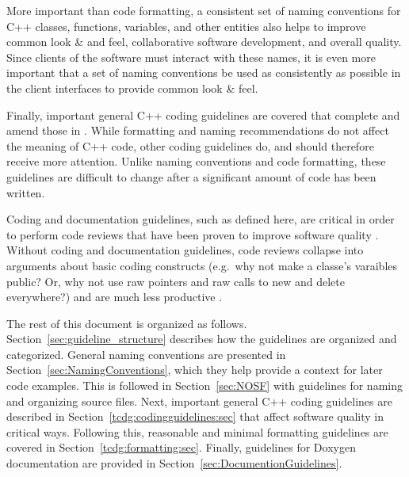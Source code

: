 More important than code formatting, a consistent set of naming
conventions for C++ classes, functions, variables, and other entities
also helps to improve common look \& and feel, collaborative software
development, and overall quality.  Since clients of the software must
interact with these names, it is even more important that a set of
naming conventions be used as consistently as possible in the client
interfaces to provide common look \& feel.

Finally, important general C++ coding guidelines are covered that
complete and amend those in {}\cite{C++CodingStandards05}.  While
formatting and naming recommendations do not affect the meaning of C++
code, other coding guidelines do, and should therefore receive more
attention.  Unlike naming conventions and code formatting, these
guidelines are difficult to change after a significant amount of code
has been written.

Coding and documentation guidelines, such as defined here, are
critical in order to perform code reviews that have been proven to
improve software quality {}\cite{CodeComplete2nd04}.  Without coding
and documentation guidelines, code reviews collapse into arguments
about basic coding constructs (e.g.\ why not make a classe's varaibles
public?  Or, why not use raw pointers and raw calls to new and delete
everywhere?) and are much less productive
{}\cite{ImplementingLeanSoftwareDevelopment}.

The rest of this document is organized as follows.
Section~\ref{sec:guideline_structure} describes how the guidelines are
organized and categorized.  General naming conventions are presented
in Section~\ref{sec:NamingConventions}, which they help provide a
context for later code examples.  This is followed in
Section~\ref{sec:NOSF} with guidelines for naming and organizing
source files.  Next, important general C++ coding guidelines are
described in Section~\ref{tcdg:codingguidelines:sec} that affect
software quality in critical ways.  Following this, reasonable and
minimal formatting guidelines are covered in
Section~\ref{tcdg:formatting:sec}.  Finally, guidelines for Doxygen
documentation are provided in Section~\ref{sec:DocumentionGuidelines}.

